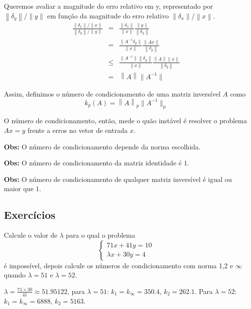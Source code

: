 Queremos avaliar a magnitude do erro relativo em y, representado por $\left\|\delta_y\right\|/\|y\|$ em função da magnitude do erro relativo $\left\|\delta_x\right\|/\left\|x\right\|$.
\begin{eqnarray*}
\frac{\left\|\delta_x\right\|/\left\|x\right\|}{\left\|\delta_y\right\|/\|y\|} &=& \frac{\left\|\delta_x\right\|}{\left\|x\right\|}\frac{\|y\|}{\left\|\delta_y\right\|}\\ 
&=& \frac{\|A^{-1}\delta_y\|}{\left\|x\right\|}\frac{\|Ax\|}{\left\|\delta_y\right\|} \\
&\leq& \frac{\|A^{-1}\|\left\|\delta_y\right\|}{\left\|x\right\|}\frac{\left\|A\right\|\left\|x\right\|}{\left\|\delta_y\right\|}\\
&=& \left\|A\right\|\|A^{-1}\|  
\end{eqnarray*}

Assim, definimos o número de condicionamento de uma matriz inversível $A$ como
$$k_p(A)=\left\|A\right\|_p \|A^{-1}\|_p$$

O número de condicionamento, então, mede o quão instável é resolver o problema $Ax=y$ frente a erros no vetor de entrada $x$.

{\bf Obs:} O número de condicionamento depende da norma escolhida.

{\bf Obs:} O número de condicionamento da matriz identidade é $1$.

{\bf Obs:} O número de condicionamento de qualquer matriz inversível é igual ou maior que $1$.

\subsection*{Exercícios}

\begin{exer} Calcule o valor de $\lambda$ para o qual o problema
$$\left\{ \begin{array}{l}71x+41y=10\\
\lambda x+30y=4
\end{array}
\right.$$
é impossível, depois calcule os números de condicionamento com norma 1,2 e $\infty$ quando $\lambda=51$ e $\lambda=52$.
\end{exer}
\begin{resp}
  
$\lambda=\frac{71\times 30}{41}\approx  51.95122$, para $\lambda=51$: $k_1=k_\infty=350.4$, $k_2=262.1$. Para $\lambda=52$: $k_1=k_\infty= 6888$, $k_2=5163$.    
  
\end{resp}

